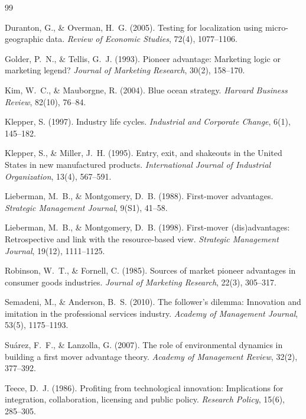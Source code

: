 \begin{thebibliography}{99}

Duranton, G., \& Overman, H.~G. (2005). Testing for localization using
micro-geographic data. \emph{Review of Economic Studies}, 72(4),
1077--1106.

Golder, P.~N., \& Tellis, G.~J. (1993). Pioneer advantage: Marketing logic or
marketing legend? \emph{Journal of Marketing Research}, 30(2), 158--170.

Kim, W.~C., \& Mauborgne, R. (2004). Blue ocean strategy. \emph{Harvard
Business Review}, 82(10), 76--84.

Klepper, S. (1997). Industry life cycles. \emph{Industrial and Corporate
Change}, 6(1), 145--182.

Klepper, S., \& Miller, J.~H. (1995). Entry, exit, and shakeouts in the
United States in new manufactured products. \emph{International Journal
of Industrial Organization}, 13(4), 567--591.

Lieberman, M.~B., \& Montgomery, D.~B. (1988). First-mover advantages.
\emph{Strategic Management Journal}, 9(S1), 41--58.

Lieberman, M.~B., \& Montgomery, D.~B. (1998). First-mover (dis)advantages:
Retrospective and link with the resource-based view. \emph{Strategic
Management Journal}, 19(12), 1111--1125.

Robinson, W.~T., \& Fornell, C. (1985). Sources of market pioneer advantages
in consumer goods industries. \emph{Journal of Marketing Research}, 22(3),
305--317.

Semadeni, M., \& Anderson, B.~S. (2010). The follower's dilemma:
Innovation and imitation in the professional services industry.
\emph{Academy of Management Journal}, 53(5), 1175--1193.

Su\'arez, F.~F., \& Lanzolla, G. (2007). The role of environmental
dynamics in building a first mover advantage theory. \emph{Academy of
Management Review}, 32(2), 377--392.

Teece, D.~J. (1986). Profiting from technological innovation:
Implications for integration, collaboration, licensing and public
policy. \emph{Research Policy}, 15(6), 285--305.

\end{thebibliography}
